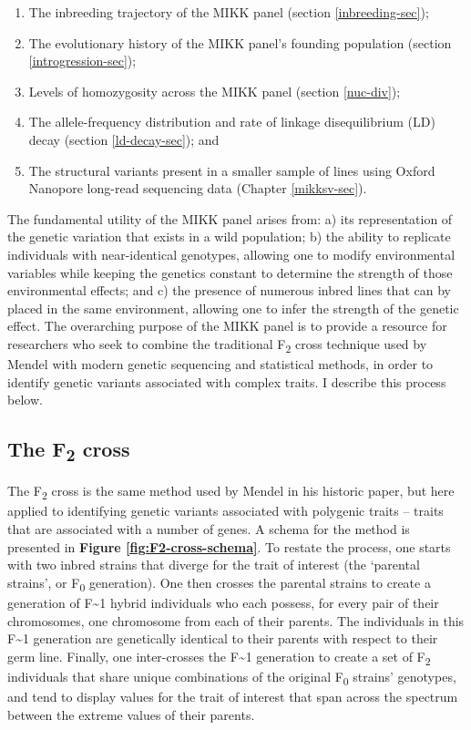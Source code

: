 \documentclass[
]{book}
\begin{document}
\begin{enumerate}
\def\labelenumi{\arabic{enumi}.}
\item
  The inbreeding trajectory of the MIKK panel (section \ref{inbreeding-sec});
\item
  The evolutionary history of the MIKK panel's founding population (section \ref{introgression-sec});
\item
  Levels of homozygosity across the MIKK panel (section \ref{nuc-div});
\item
  The allele-frequency distribution and rate of linkage disequilibrium (LD) decay (section \ref{ld-decay-sec}); and
\item
  The structural variants present in a smaller sample of lines using Oxford Nanopore long-read sequencing data (Chapter \ref{mikksv-sec}).
\end{enumerate}

The fundamental utility of the MIKK panel arises from: a) its representation of the genetic variation that exists in a wild population; b) the ability to replicate individuals with near-identical genotypes, allowing one to modify environmental variables while keeping the genetics constant to determine the strength of those environmental effects; and c) the presence of numerous inbred lines that can by placed in the same environment, allowing one to infer the strength of the genetic effect. The overarching purpose of the MIKK panel is to provide a resource for researchers who seek to combine the traditional F\textsubscript{2} cross technique used by Mendel with modern genetic sequencing and statistical methods, in order to identify genetic variants associated with complex traits. I describe this process below.

\hypertarget{the-f2-cross}{%
\subsection{\texorpdfstring{The F\textsubscript{2} cross}{The F2 cross}}\label{the-f2-cross}}

The F\textsubscript{2} cross is the same method used by Mendel in his historic paper, but here applied to identifying genetic variants associated with polygenic traits -- traits that are associated with a number of genes. A schema for the method is presented in \textbf{Figure \ref{fig:F2-cross-schema}}. To restate the process, one starts with two inbred strains that diverge for the trait of interest (the `parental strains', or F\textsubscript{0} generation). One then crosses the parental strains to create a generation of F\textasciitilde1 hybrid individuals who each possess, for every pair of their chromosomes, one chromosome from each of their parents. The individuals in this F\textasciitilde1 generation are genetically identical to their parents with respect to their germ line. Finally, one inter-crosses the F\textasciitilde1 generation to create a set of F\textsubscript{2} individuals that share unique combinations of the original F\textsubscript{0} strains' genotypes, and tend to display values for the trait of interest that span across the spectrum between the extreme values of their parents.
\end{document}
